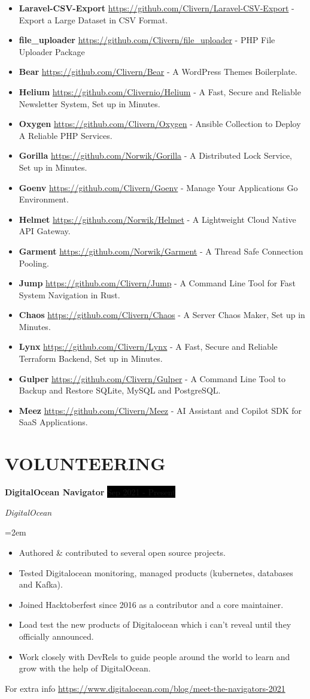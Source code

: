 \documentclass[paper=a4,fontsize=11pt]{scrartcl} %
\newcommand{\sepspace}{\vspace*{1em}}		%
\newcommand{\NewPart}[1]{\section*{\uppercase{#1}}}
\newcommand{\EducationEntry}[4]{
		\noindent \textbf{#1} \hfill      %
		\colorbox{Black}{%
			\parbox{6em}{%
			\hfill\color{White}#2}} \par  %
		\noindent \textit{#3} \par        %
		\noindent\hangindent=2em\hangafter=0 \small #4 %
		\normalsize \par}
\newcommand{\WorkEntry}[4]{				  %
		\noindent \textbf{#1} \hfill      %
		\colorbox{Black}{\color{White}#2} \par  %
		\noindent \textit{#3} \par              %
		\noindent\hangindent=2em\hangafter=0 \small #4 %
		\normalsize \par}
\begin{document}
\begin{itemize}
\item \textbf{Laravel-CSV-Export} \url{https://github.com/Clivern/Laravel-CSV-Export} - Export a Large Dataset in CSV Format.
\item \textbf{file_uploader} \url{https://github.com/Clivern/file_uploader} - PHP File Uploader Package
\item \textbf{Bear} \url{https://github.com/Clivern/Bear} - A WordPress Themes Boilerplate.
\item \textbf{Helium} \url{https://github.com/Clivernio/Helium} - A Fast, Secure and Reliable Newsletter System, Set up in Minutes.
\item \textbf{Oxygen} \url{https://github.com/Clivern/Oxygen} - Ansible Collection to Deploy A Reliable PHP Services.
\item \textbf{Gorilla} \url{https://github.com/Norwik/Gorilla} - A Distributed Lock Service, Set up in Minutes.
\item \textbf{Goenv} \url{https://github.com/Clivern/Goenv} - Manage Your Applications Go Environment.
\item \textbf{Helmet} \url{https://github.com/Norwik/Helmet} - A Lightweight Cloud Native API Gateway.
\item \textbf{Garment} \url{https://github.com/Norwik/Garment} - A Thread Safe Connection Pooling.
\item \textbf{Jump} \url{https://github.com/Clivern/Jump} - A Command Line Tool for Fast System Navigation in Rust.
\item \textbf{Chaos} \url{https://github.com/Clivern/Chaos} - A Server Chaos Maker, Set up in Minutes.
\item \textbf{Lynx} \url{https://github.com/Clivern/Lynx} - A Fast, Secure and Reliable Terraform Backend, Set up in Minutes.
\item \textbf{Gulper} \url{https://github.com/Clivern/Gulper} - A Command Line Tool to Backup and Restore SQLite, MySQL and PostgreSQL.
\item \textbf{Meez} \url{https://github.com/Clivern/Meez} - AI Assistant and Copilot SDK for SaaS Applications.
\end{itemize}


\NewPart{Volunteering}{}

\WorkEntry{DigitalOcean Navigator}{Sep 2021 - Present}{DigitalOcean}{\begin{itemize}
\item Authored \& contributed to several open source projects.
\item Tested Digitalocean monitoring, managed products (kubernetes, databases and Kafka).
\item Joined Hacktoberfest since 2016 as a contributor and a core maintainer.
\item Load test the new products of Digitalocean which i can't reveal until they officially announced.
\item Work closely with DevRels to guide people around the world to learn and grow with the help of DigitalOcean.
\end{itemize}
For extra info \url{https://www.digitalocean.com/blog/meet-the-navigators-2021}}
\sepspace
\end{document}
